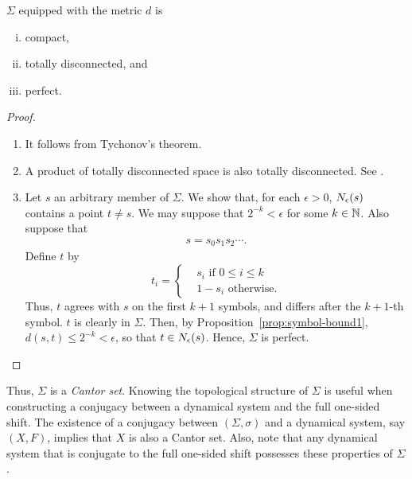 \documentclass[10pt,twoside]{book}
\begin{document}
\begin{proposition}
  $\Sigma$ equipped with the metric $d$ is 
  \begin{enumerate}[(i)]
    \item compact,
    \item totally disconnected, and
    \item perfect.
  \end{enumerate}
  \begin{proof}
    \begin{enumerate}
      \item 
        It follows from Tychonov's theorem.
      \item
        A product of totally disconnected space is also totally disconnected.
        See \citet{dugundji}.
      \item
        Let $s$ an arbitrary member of $\Sigma$.
        We show that, for each $\epsilon > 0$, $N_{\epsilon}(s)$ contains a point $t \neq s$.
        We may suppose that $2^{-k} < \epsilon$ for some $k \in \mathbb{N}$.
        Also suppose that
        \begin{align*}
          s = s_0 s_1 s_2 \cdots.
        \end{align*}
        Define $t$ by
        \begin{equation*}
          t_i = \begin{cases}
            &s_i \mbox{ if } 0 \leq i \leq k  \\
            &1 - s_i \mbox{ otherwise.}
          \end{cases}
        \end{equation*}
        Thus, $t$ agrees with $s$ on the first $k+1$ symbols, and differs after the $k+1$-th symbol.
        $t$ is clearly in $\Sigma$.
        Then, by Proposition~\ref{prop:symbol-bound1}, $d(s,t) \leq 2^{-k} < \epsilon$, so that $t \in N_{\epsilon}(s)$.
        Hence, $\Sigma$ is perfect.
    \end{enumerate}
  \end{proof}
\end{proposition}
Thus, $\Sigma$ is a \textit{Cantor set}.
Knowing the topological structure of $\Sigma$ is useful when constructing a conjugacy between a dynamical system and the full one-sided shift.
The existence of a conjugacy between $(\Sigma, \sigma)$ and a dynamical system, say $(X, F)$, implies that $X$ is also a Cantor set.
Also, note that any dynamical system that is conjugate to the full one-sided shift possesses these properties of $\Sigma$.
\end{document}
